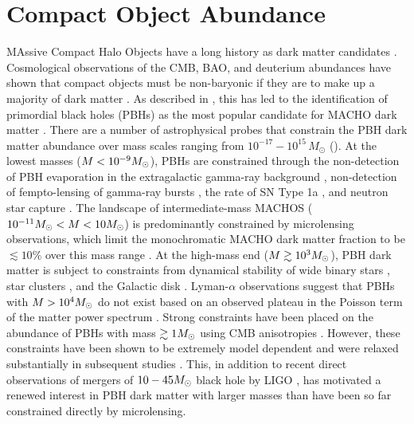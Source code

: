 \section{Compact Object Abundance }
\label{sec:compact_objects}

MAssive Compact Halo Objects \citep[MACHOs;][]{1991ApJ...366..412G} have a long history as dark matter candidates \citep{1974ApJ...193L...1O, 1980ApJS...44...73B, 1981ApJ...243..140G, 1986ApJ...304....1P, Bellido:1996, Clesse:2015, Bird:2016, Clesse:2016}. 
Cosmological observations of the CMB, BAO, and deuterium abundances have shown that compact objects must be non-baryonic if they are to make up a majority of dark matter \citep[\eg][]{Ade:2015xua}. 
As described in , this has led to the identification of primordial black holes (PBHs) as the most popular candidate for MACHO dark matter \citep{Bellido:1996}.
There are a number of astrophysical probes that constrain the PBH dark matter abundance over mass scales ranging from $10^{-17}-10^{15}\,M_\odot$ ().
At the lowest masses ($M < 10^{-9}M_\odot$), PBHs are constrained through the non-detection of PBH evaporation in the extragalactic gamma-ray background \citep[\eg,][]{2010PhRvD..81j4019C}, non-detection of fempto-lensing of gamma-ray bursts \citep[\eg,][]{2012PhRvD..86d3001B}, the rate of SN Type 1a \citep{1805.07381}, and neutron star capture \citep[\eg,][]{2013PhRvD..87l3524C}.
The landscape of intermediate-mass MACHOS ($10^{-11} M_\odot < M < 10 M_\odot$) is predominantly constrained by microlensing observations, which limit the monochromatic MACHO dark matter fraction to be $\lesssim 10\%$ over this mass range \citep[\eg][]{Alcock:2001,Tisserand:2007,1701.02151}.
At the high-mass end ($M \gtrsim 10^3M_\odot$), PBH dark matter is subject to constraints from dynamical stability of wide binary stars \citep[\eg][]{Yoo:2004}, star clusters \citep[\eg]{Brandt:2016}, and the Galactic disk \citep[\eg][]{Lacey:1985}.
Lyman-$\alpha$ observations suggest that PBHs with $M > 10^4M_\odot$ do not exist based on an observed plateau in the Poisson term of the matter power spectrum \citep{astro-ph/0302035}.
Strong constraints have been placed on the abundance of PBHs with mass $\gtrsim 1 M_\odot$ using CMB anisotropies \citep{2008ApJ...680..829R}.
However, these constraints have been shown to be extremely model dependent and were relaxed substantially in subsequent studies \citep{1612.05644}.
This, in addition to recent direct observations of mergers of $10-45 M_\odot$ black hole by LIGO \citep{1602.03837},
has motivated a renewed interest in PBH dark matter with larger masses than have been so far constrained directly by microlensing.

